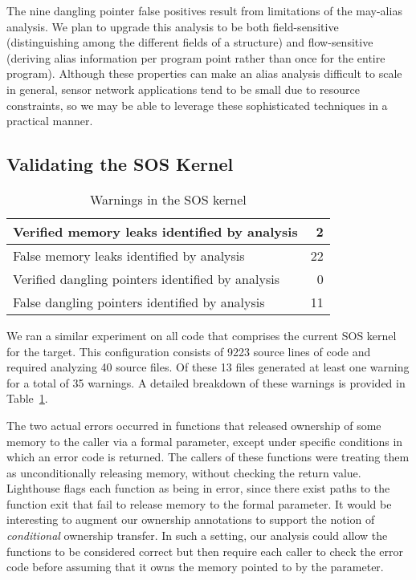 \smallskip{}

The nine dangling pointer false positives result from limitations of
the may-alias analysis.  
We plan to upgrade this analysis to be both field-sensitive
(distinguishing among the different fields of a structure) and
flow-sensitive (deriving alias information per program point rather
than once for the entire program).  Although these properties can make
an alias analysis difficult to scale in general, sensor network
applications tend to be small due to resource constraints, so we may
be able to leverage these sophisticated techniques in a practical manner.


\subsection{Validating the SOS Kernel}

\begin{table}
\caption{Warnings in the SOS kernel}
%
\label{tab:kernel}
\centering 
\begin{tabular}{| l | r |}
    \hline 
    Verified memory leaks identified by analysis & 2 \\
    \hline
    False memory leaks identified by analysis & 22 \\
    \hline 
    Verified dangling pointers identified by analysis & 0 \\
    \hline 
    False dangling pointers identified by analysis & 11 \\
    \hline 
\end{tabular} 
%
\end{table}


We ran a similar experiment on all code that comprises the current SOS kernel
for the  target.  This configuration consists of 9223
source lines of code and required analyzing 40 source files.  Of these
13 files generated at least one warning for a total of 35 warnings.  A
detailed breakdown of these warnings is provided in
Table~\ref{tab:kernel}.

The two actual errors occurred in
functions that released ownership of some memory to the
caller via a formal parameter,
except 
%
%
under specific conditions in which 
%
an error code is returned.
%
The callers of these functions were treating them as unconditionally
releasing memory, without checking the return value.  Lighthouse flags
each function as being in error, since there exist paths to the
function exit that fail to release memory to the formal parameter.  
It would be
interesting to augment our ownership annotations to support the notion
of {\em conditional} ownership transfer.  In such a setting, our
analysis could allow the functions to be considered correct but then
require each caller to check the error code before assuming that it owns
the memory pointed to by the parameter.

